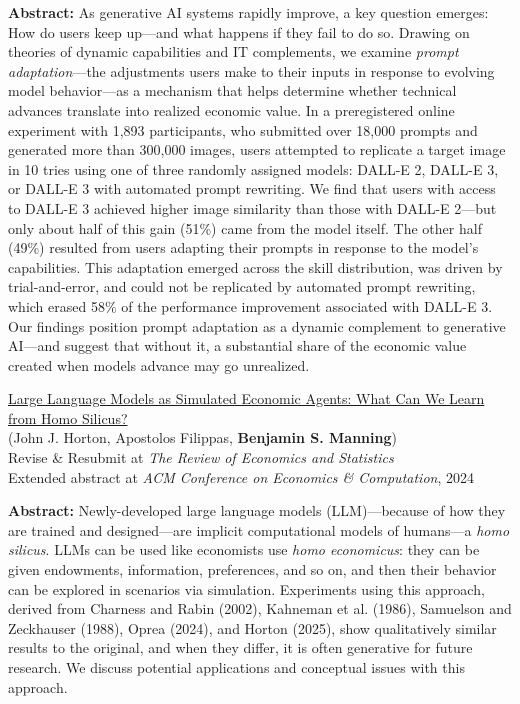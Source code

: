 \documentclass[margin,line,pifont,palatino,courier, 9pt]{res}
\begin{document}
\begin{resume}
\begin{singlespace}
\footnotesize
\textbf{Abstract: }As generative AI systems rapidly improve, a key question emerges: How do users keep up---and what happens if they fail to do so. 
Drawing on theories of dynamic capabilities and IT complements, we examine \textit{prompt adaptation}---the adjustments users make to their inputs in response to evolving model behavior---as a mechanism that helps determine whether technical advances translate into realized economic value. 
In a preregistered online experiment with 1,893 participants, who submitted over 18,000 prompts and generated more than 300,000 images, users attempted to replicate a target image in 10 tries using one of three randomly assigned models: DALL-E 2, DALL-E 3, or DALL-E 3 with automated prompt rewriting. 
We find that users with access to DALL-E 3 achieved higher image similarity than those with DALL-E 2---but only about half of this gain (51\%) came from the model itself. 
The other half (49\%) resulted from users adapting their prompts in response to the model's capabilities. 
This adaptation emerged across the skill distribution, was driven by trial-and-error, and could not be replicated by automated prompt rewriting, which erased 58\% of the performance improvement associated with DALL-E 3. Our findings position prompt adaptation as a dynamic complement to generative AI---and suggest that without it, a substantial share of the economic value created when models advance may go unrealized.
\end{singlespace}

\href{https://www.nber.org/papers/w31122}{Large Language Models as Simulated Economic Agents: What Can We Learn from Homo Silicus?}\\
(John J. Horton\footnotemark[\value{footnote}], Apostolos Filippas\footnotemark[\value{footnote}], \textbf{Benjamin S. Manning}\footnotemark[\value{footnote}])\\
Revise \& Resubmit at \textit{The Review of Economics and Statistics}\\
Extended abstract at \textit{ACM Conference on Economics \& Computation}, 2024

\begin{singlespace}
\footnotesize
\textbf{Abstract: } Newly-developed large language models (LLM)---because of how they are trained and designed---are implicit computational models of humans---a \emph{homo silicus}.
LLMs can be used like economists use \emph{homo economicus}: they can be given endowments, information, preferences, and so on, and then their behavior can be explored in scenarios via simulation.
Experiments using this approach, derived from Charness and Rabin (2002), Kahneman et al. (1986), Samuelson and Zeckhauser (1988), Oprea (2024), and Horton (2025), show qualitatively similar results to the original, and when they differ, it is often generative for future research.
We discuss potential applications and conceptual issues with this approach.
\end{singlespace}


\end{resume}
\end{document}
